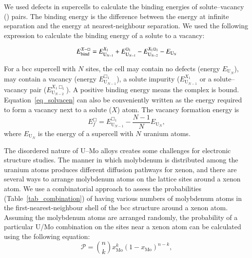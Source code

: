 We used defects in supercells to calculate the binding energies
of solute--vacancy () pairs. The binding energy is the
difference between the energy at infinite separation and the energy at
nearest-neighbour separation. We used the following expression to calculate the
binding energy of a solute to a vacancy:

\begin{equation}
  E_\text{bind}^{\ce{$X$-\Box}}
    = E^{X_1}_{\mathrm{U}_{N-1}} + E^{\Box_1}_{\mathrm{U}_{N-1}}
    - E^{X_1\Box_1}_{\mathrm{U}_{N-2}} - E_{\mathrm{U}_N}
  \label{eq_solvacen}
\end{equation}



For a bcc supercell with $N$ sites, the cell may contain no defects (energy
$E_{\mathrm{U}_N}$), may contain a vacancy (energy $E^{\Box_1}_{\mathrm{U}_{N-1}}$), a solute
impurity ($E^{X_1}_{\mathrm{U}_{N-1}}$ or a solute--vacancy pair
($E^{X_1\Box_1}_{\mathrm{U}_{N-2}}$).
A positive binding energy means the complex is bound.
Equation~\eqref{eq_solvacen} can
also be conveniently written as the energy required to form a vacancy next to
a solute ($X$) atom. The vacancy formation energy is 
\begin{equation}
    E^{\Box}_f = E^{\Box_1}_{\mathrm{U}_{N-1}}
        - \frac{N-1}{N} E_{\mathrm{U}_N},
  \label{eq_vacen}
\end{equation}
where $E_{\mathrm{U}_N}$ is the energy of a supercell with $N$ uranium atoms.

The disordered nature of U--Mo alloys creates some challenges for electronic
structure studies. The manner in which molybdenum is distributed among the
uranium atoms produces different diffusion pathways
for xenon, and there are several ways to arrange molybdenum atoms on the
lattice sites around a xenon atom. We use a combinatorial approach to assess
the probabilities (Table~\ref{tab_combination}) of having various numbers of
molybdenum atoms in the first-nearest-neighbour shell of the bcc structure
around a xenon atom. Assuming the molybdenum atoms are arranged randomly, the
probability of a particular U/Mo combination on the sites near a xenon
atom can be calculated using the following equation:
\begin{equation}\label{eq_combination}
  \mathcal{P} = \binom{n}{k} x^k_\text{Mo} ( 1 - x_\text{Mo})^{n-k},
\end{equation}

